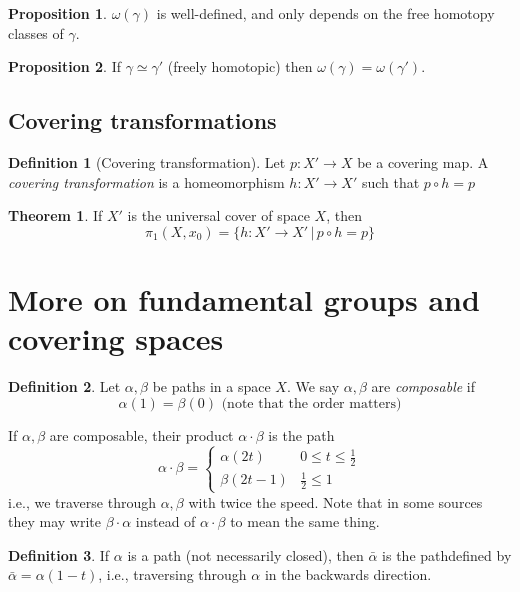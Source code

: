 \documentclass[a4paper,14pt]{extarticle}
\theoremstyle{definition}
\newtheorem*{theorem}{Theorem}
\newtheorem*{definition}{Definition}
\newtheorem*{proposition}{Proposition}
\begin{document}
\begin{proposition}
  $\omega(\gamma)$ is well-defined, and only depends on the free homotopy classes of $\gamma$.
\end{proposition}

\begin{proposition}
  If $\gamma\simeq\gamma'$ (freely homotopic) then $\omega(\gamma)=\omega(\gamma')$.
\end{proposition}

\subsection{Covering transformations}

\begin{definition}[Covering transformation]
  Let $p:X'\rightarrow X$ be a covering map. A \emph{covering transformation} is a homeomorphism $h:X'\rightarrow X'$ such that $p\circ h=p$
\end{definition}

\begin{theorem}
  If $X'$ is the universal cover of space $X$, then 
  \[\pi_1(X,x_0)=\{h:X'\rightarrow X'\,|\,p\circ h =p\}\]
\end{theorem}

\section{More on fundamental groups and covering spaces}
\begin{definition}
  Let $\alpha, \beta$ be paths in a space $X$. We say $\alpha, \beta$ are \textit{composable}
  if \[\alpha(1)=\beta(0)\text{ (note that the order matters)}\]
\end{definition}

\noindent If $\alpha,\beta$ are composable, their product $\alpha\cdot\beta$ is the path 
\[\alpha\cdot\beta=\begin{cases}
  \alpha(2t) & 0\leq t\leq \frac{1}{2} \\
  \beta(2t-1) & \frac{1}{2}\leq 1
\end{cases}\]
i.e., we traverse through $\alpha, \beta$ with twice the speed. Note that in some sources
they may write $\beta\cdot\alpha$ instead of $\alpha\cdot\beta$ to mean the same thing.

\begin{definition}
  If $\alpha$ is a path (not necessarily closed), then $\bar{\alpha}$ is the 
  pathdefined by $\bar{\alpha}=\alpha(1-t)$, i.e., traversing through $\alpha$ in the 
  backwards direction. 
\end{definition}
\end{document}
